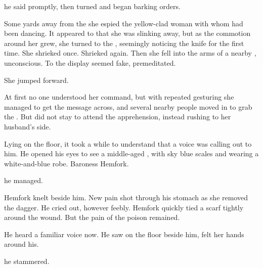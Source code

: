  he said promptly, then turned and began barking orders. 

Some yards away from the \rayuth she espied the yellow-clad woman with whom \Icor{} had been dancing. It appeared to \Tiroco{} that she was slinking away, but as the commotion around her grew, she turned to the \rayuth, seemingly noticing the knife for the first time. She shrieked once. Shrieked again. Then she fell into the arms of a nearby \dax, unconscious. 
To \Tiroco{} the display seemed fake, premeditated. 

She jumped forward. 

At first no one understood her command, but with repeated gesturing she managed to get the message across, and several nearby people moved in to grab the \human. But \Tiroco{} did not stay to attend the apprehension, instead rushing to her husband's side. 


Lying on the floor, it took \Icor{} a while to understand that a voice was calling out to him. 
He opened his eyes to see a middle-aged \sphyle{}, with sky blue scales and wearing a white-and-blue robe. Baroness \Risvet{} Hemfork. 

 he managed. 

 Hemfork knelt beside him.  New pain shot through his stomach as she removed the dagger. He cried out, however feebly. Hemfork quickly tied a scarf tightly around the wound. But the pain of the poison remained. 

He heard a familiar voice now. \ta{\Icor!} He saw \Tiroco{} on the floor beside him, felt her hands around his. 

 he stammered. 


